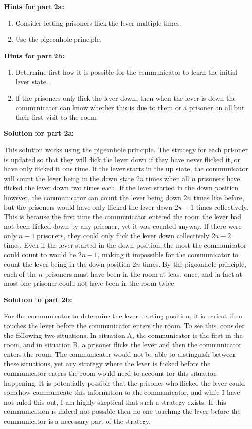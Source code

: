 \textbf{Hints for part 2a:}

\begin{enumerate}
	\item Consider letting prisoners flick the lever multiple times.
	\item Use the pigeonhole principle.
\end{enumerate}

\textbf{Hints for part 2b:}

\begin{enumerate}
	\item Determine first how it is possible for the communicator to learn the initial lever state.
	\item If the prisoners only flick the lever down, then when the lever is down the communicator can know whether this is due to them or a prisoner on all but their first visit to the room.
\end{enumerate}

\textbf{Solution for part 2a:}

This solution works using the pigeonhole principle. The strategy for each prisoner is updated so that they will flick the lever down if they have never flicked it, or have only flicked it one time. If the lever starts in the up state, the communicator will count the lever being in the down state $2n$ times when all $n$ prisoners have flicked the lever down two times each. If the lever started in the down position however, the communicator can count the lever being down $2n$ times like before, but the prisoners would have only flicked the lever down $2n - 1$ times collectively. This is because the first time the communicator entered the room the lever had not been flicked down by any prisoner, yet it was counted anyway. If there were only $n - 1$ prisoners, they could only flick the lever down collectively $2n - 2$ times. Even if the lever started in the down position, the most the communicator could count to would be $2n - 1$, making it impossible for the communicator to count the lever being in the down position $2n$ times. By the pigeonhole principle, each of the $n$ prisoners must have been in the room at least once, and in fact at most one prisoner could not have been in the room twice.

\textbf{Solution to part 2b:}

For the communicator to determine the lever starting position, it is easiest if no touches the lever before the communicator enters the room. To see this, consider the following two situations. In situation A, the communicator is the first in the room, and in situation B, a prisoner flicks the lever and then the communicator enters the room. The communicator would not be able to distinguish between these situations, yet any strategy where the lever is flicked before the communicator enters the room would need to account for this situation happening. It is potentially possible that the prisoner who flicked the lever could somehow communicate this information to the communicator, and while I have not ruled this out, I am highly skeptical that such a strategy exists. If this communication is indeed not possible then no one touching the lever before the communicator is a necessary part of the strategy.


